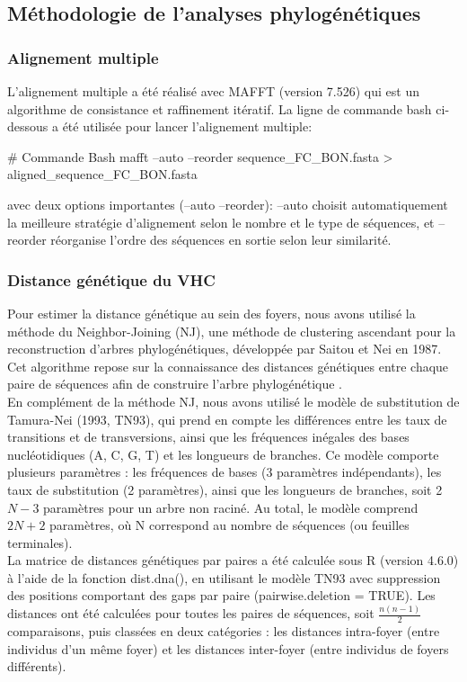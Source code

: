 \documentclass[a4paper,12pt]{article}
\begin{document}
\subsection{Méthodologie de l'analyses phylogénétiques}
\subsubsection *{Alignement multiple}

L’alignement multiple a été réalisé avec MAFFT (version 7.526) qui est un algorithme de consistance et raffinement itératif. La ligne de commande bash ci-dessous a été utilisée pour lancer l'alignement multiple:
\begin{terminal}
# Commande Bash 
 mafft --auto --reorder sequence_FC_BON.fasta > aligned_sequence_FC_BON.fasta
\end{terminal}
avec deux options importantes (--auto --reorder):  --auto choisit automatiquement la meilleure stratégie d’alignement selon le nombre et le type de séquences, et --reorder réorganise l’ordre des séquences en sortie selon leur similarité. 

\subsubsection {Distance génétique du VHC}
Pour estimer la distance génétique au sein des foyers, nous avons utilisé la méthode du Neighbor-Joining (NJ), une méthode de clustering ascendant pour la reconstruction d’arbres phylogénétiques, développée par Saitou et Nei en 1987. Cet algorithme repose sur la connaissance des distances génétiques entre chaque paire de séquences  afin de construire l’arbre phylogénétique  \cite{NeighborJoining2026}.\\


En complément de la méthode NJ, nous avons utilisé le modèle de substitution de Tamura-Nei (1993, TN93), qui prend en compte les différences entre les taux de transitions et de transversions, ainsi que les fréquences inégales des bases nucléotidiques (A, C, G, T) et les longueurs de branches. Ce modèle comporte plusieurs paramètres : les fréquences de bases (3 paramètres indépendants), les taux de substitution (2 paramètres), ainsi que les longueurs de branches, soit 2$N - 3$ paramètres pour un arbre non raciné. Au total, le modèle comprend $2N + 2$ paramètres, où N correspond au nombre de séquences (ou feuilles terminales).\\


La matrice de distances génétiques par paires a été calculée sous R (version 4.6.0) à l’aide de la fonction dist.dna(), en utilisant le modèle TN93 avec suppression des positions comportant des gaps par paire (pairwise.deletion = TRUE). Les distances ont été calculées pour toutes les paires de séquences, soit $\frac{n(n-1)}{2}$ comparaisons, puis classées en deux catégories : les distances intra-foyer (entre individus d’un même foyer) et les distances inter-foyer (entre individus de foyers différents).
\end{document}

